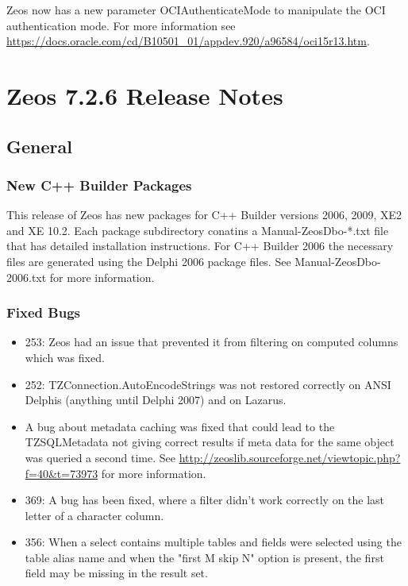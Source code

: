 \documentclass[a4paper,12pt,oneside]{book}
\begin{document}
Zeos now has a new parameter OCIAuthenticateMode to manipulate the OCI authentication mode.
For more information see \url{https://docs.oracle.com/cd/B10501_01/appdev.920/a96584/oci15r13.htm}.

\chapter{Zeos 7.2.6 Release Notes}

\section{General}
\label{sec:Rev6_General}

\subsection{New C++ Builder Packages}
\label{sec:Rev6_General_CppBuilderPackages}
This release of Zeos has new packages for C++ Builder versions 2006, 2009, XE2 and XE 10.2.
Each package subdirectory conatins a Manual-ZeosDbo-*.txt file that has detailed installation instructions.
For C++ Builder 2006 the necessary files are generated using the Delphi 2006 package files.
See Manual-ZeosDbo-2006.txt for more information.

\subsection{Fixed Bugs}
\label{sec:Rev6_General_FixedBugs}

\begin{itemize}
\item 253: Zeos had an issue that prevented it from filtering on computed columns which was fixed.
\item 252: TZConnection.AutoEncodeStrings was not restored correctly on ANSI Delphis (anything until Delphi 2007) and on Lazarus.
\item 	
  A bug about metadata caching was fixed that could lead to the TZSQLMetadata not giving correct results if meta data for the same object was queried a second time.
	See \url{http://zeoslib.sourceforge.net/viewtopic.php?f=40&t=73973} for more information.
\item
  369:
	A bug has been fixed, where a filter didn't work correctly on the last letter of a character column.
\item
  356:
	When a select contains multiple tables and fields were selected using the table alias name and when the "first M skip N" option is present, the first field may be missing in the result set. 
\end{itemize}
\end{document}
